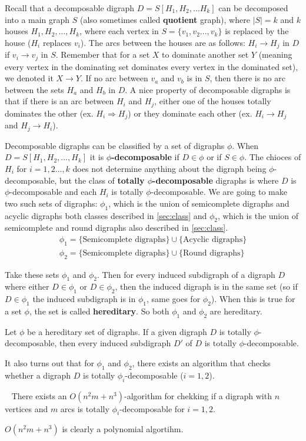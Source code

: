 Recall that a decomposable digraph $D=S[H_1,H_2,\dots H_k]$ can be decomposed into a main graph $S$ (also sometimes called \textbf{quotient} graph), where $|S|=k$ and $k$ houses $H_1,H_2,\dots , H_k$, where each vertex in $S=\lbrace v_1,v_2\dots ,v_k\rbrace$ is replaced by the house ($H_i$ replaces $v_i$).
The arcs between the houses are as follows: $H_i \rightarrow H_j$ in $D$ if $v_i\rightarrow v_j$ in $S$. 
Remember that for a set $X$ to dominate another set $Y$ (meaning every vertex in the dominating set dominates every vertex in the dominated set), we denoted it $X \rightarrow Y$. 
If no arc between $v_a$ and $v_b$ is in $S$, then there is no arc between the sets $H_a$ and $H_b$ in $D$. 
A nice property of decomposable digraphs is that if there is an arc between $H_i$ and $H_j$, either one of the houses totally dominates the other (ex. $H_i \Rightarrow H_j$) or they dominate each other (ex. $H_i \rightarrow H_j$ and $H_j\rightarrow H_i$).

\noindent Decomposable digraphs can be classified by a set of digraphs $\phi$. 
When $D=S[H_1,H_2,\dots ,H_k]$ it is \textbf{$\phi$-decomposable} if $D\in \phi$ or if $S\in \phi$. 
The chioces of $H_i$ for $i=1,2\dots , k$ does not determine anything about the digraph being $\phi$-decomposable, but the class of \textbf{totally $\phi$-decomposable} digraphs is where $D$ is $\phi$-decomposable and each $H_i$ is totally $\phi$-decomposable. 
We are going to make two such sets of digraphs: $\phi_1$, which is the union of semicomplete digraphs and acyclic digraphs both classes described in \autoref{sec:class} and $\phi_2$, which is the union of semicomplete and round digraphs also described in \autoref{sec:class}.  
\begin{align}
    \phi_1=\lbrace \text{Semicomplete digraphs}\rbrace\cup \lbrace \text{Acyclic digraphs}\rbrace
    \label{eq:phi1}\\
    \phi_2=\lbrace \text{Semicomplete digraphs}\rbrace\cup \lbrace \text{Round digraphs}\rbrace
    \label{eq:phi2}
\end{align}

Take these sets $\phi_1$ and $\phi_2$. 
Then for every induced subdigraph of a digraph $D$ where either $D\in \phi_1$ or $D\in \phi_2$, then the induced digraph is in the same set (so if $D\in \phi_1$ the induced subdigraph is in $\phi_1$, same goes for $\phi_2$).
When this is true for a set $\phi$, the set is called \textbf{hereditary}. So both $\phi_1$ and $\phi_2$ are hereditary.
\begin{lemma}
    Let $\phi$ be a hereditary set of digraphs. If a given digraph $D$ is totally $\phi$-decomposable, then every induced subdigraph $D'$ of $D$ is totally $\phi$-decomposable.
    \label{lemma:hereditary}
\end{lemma}
It also turns out that for $\phi_1$ and $\phi_2$, there exists an algorithm that checks whether a digraph $D$ is totally $\phi_i$-decomposable ($i=1,2$).
\begin{thm}~\cite{banggutin}
    There exists an $O(n^2m+n^3)$-algorithm for chekking if a digraph with $n$ vertices and $m$ arcs is totally $\phi_i$-decomposable for $i=1,2$.
    \label{thm:phipoly}
\end{thm}
\noindent $O(n^2m+n^3)$ is clearly a polynomial algortihm. 